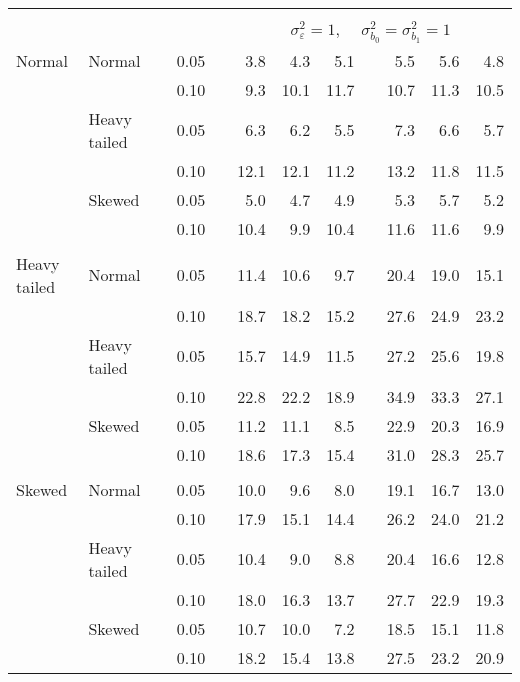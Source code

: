 \begin{table}[ht]
\begin{scriptsize}
\begin{tabular}{ll p{.1cm} c p{.1cm} rrr p{.1cm} rrr}
&&&&&&&&&&&\\
& && && \multicolumn{7}{c}{$\sigma_{\varepsilon}^2 = 1$, \ \ $\sigma_{b_0}^2 = \sigma_{b_1}^2 = 1$} \\ \cline{6-12}
\rowcolor{gray!20} Normal & Normal &  & 0.05 &  & 3.8 & 4.3 & 5.1 &  & 5.5 & 5.6 & 4.8 \\ 
\rowcolor{gray!20}    &  &  & 0.10 &  & 9.3 & 10.1 & 11.7 &  & 10.7 & 11.3 & 10.5 \\ 
\rowcolor{gray!20}    & Heavy tailed &  & 0.05 &  & 6.3 & 6.2 & 5.5 &  & 7.3 & 6.6 & 5.7 \\ 
\rowcolor{gray!20}    &  &  & 0.10 &  & 12.1 & 12.1 & 11.2 &  & 13.2 & 11.8 & 11.5 \\ 
\rowcolor{gray!20}    & Skewed &  & 0.05 &  & 5.0 & 4.7 & 4.9 &  & 5.3 & 5.7 & 5.2 \\ 
\rowcolor{gray!20}    &  &  & 0.10 &  & 10.4 & 9.9 & 10.4 &  & 11.6 & 11.6 & 9.9 \\ 
&&&&&&&&&&&\\
  Heavy tailed & Normal &  & 0.05 &  & 11.4 & 10.6 & 9.7 &  & 20.4 & 19.0 & 15.1 \\ 
   &  &  & 0.10 &  & 18.7 & 18.2 & 15.2 &  & 27.6 & 24.9 & 23.2 \\ 
   & Heavy tailed &  & 0.05 &  & 15.7 & 14.9 & 11.5 &  & 27.2 & 25.6 & 19.8 \\ 
   &  &  & 0.10 &  & 22.8 & 22.2 & 18.9 &  & 34.9 & 33.3 & 27.1 \\ 
   & Skewed &  & 0.05 &  & 11.2 & 11.1 & 8.5 &  & 22.9 & 20.3 & 16.9 \\ 
   &  &  & 0.10 &  & 18.6 & 17.3 & 15.4 &  & 31.0 & 28.3 & 25.7 \\ 
&&&&&&&&&&&\\
  Skewed & Normal &  & 0.05 &  & 10.0 & 9.6 & 8.0 &  & 19.1 & 16.7 & 13.0 \\ 
   &  &  & 0.10 &  & 17.9 & 15.1 & 14.4 &  & 26.2 & 24.0 & 21.2 \\ 
   & Heavy tailed &  & 0.05 &  & 10.4 & 9.0 & 8.8 &  & 20.4 & 16.6 & 12.8 \\ 
   &  &  & 0.10 &  & 18.0 & 16.3 & 13.7 &  & 27.7 & 22.9 & 19.3 \\ 
   & Skewed &  & 0.05 &  & 10.7 & 10.0 & 7.2 &  & 18.5 & 15.1 & 11.8 \\ 
   &  &  & 0.10 &  & 18.2 & 15.4 & 13.8 &  & 27.5 & 23.2 & 20.9 \\ 


\end{tabular}
\end{scriptsize}
\end{table}
